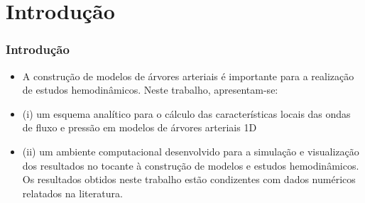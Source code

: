 \documentclass[10pt]{beamer}
\theoremstyle{remark}
\theoremstyle{definition}
\begin{document}
	\section{Introdução}
	\begin{frame}[allowframebreaks]
		\frametitle{Introdução}
		
		\begin{itemize}
			\item A construção de modelos de árvores arteriais é importante para a realização de estudos hemodinâmicos. Neste trabalho, apresentam-se: 
			\item (i) um esquema analítico para o cálculo das características locais das ondas de fluxo e pressão em modelos de árvores arteriais 1D 
			\item (ii) um ambiente computacional desenvolvido para a simulação e visualização dos resultados no tocante à construção de modelos e estudos hemodinâmicos. Os resultados obtidos neste trabalho estão condizentes com dados numéricos relatados na literatura.
			
		\end{itemize}
		
	\end{frame}
	
\end{document}
